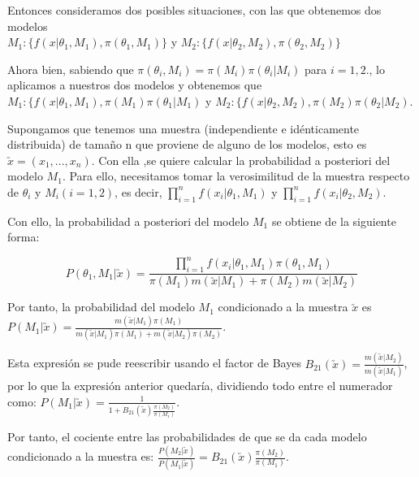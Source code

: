Entonces consideramos dos posibles situaciones, con las que obtenemos dos modelos \\$ M_1 : \{f(x | \theta_1, M_1), \pi(\theta_1, M_1) \}$ y $ M_2 : \{f(x | \theta_2, M_2), \pi(\theta_2,M _2) \}$

Ahora bien, sabiendo que $\pi(\theta_i, M_i) =  \pi(M_i) \pi(\theta_i|M_i)$  para $i = 1,2.$, lo aplicamos a nuestros dos modelos y obtenemos que $ M_1 : \{f(x | \theta_1, M_1), \pi(M_1) \pi(\theta_1|M_1)$ y $M_2 : \{f(x | \theta_2, M_2), \pi(M_2)  \pi(\theta_2|M_2)$.

Supongamos que tenemos una muestra (independiente e idénticamente distribuida) de tamaño n que proviene de alguno de los modelos, esto es $\utilde{x} = (x_1,...,x_n)$. Con ella ,se quiere calcular la probabilidad a posteriori del modelo $M_1$. Para ello, necesitamos tomar la verosimilitud de la muestra respecto de $\theta_i$ y $M_i (i = 1,2)$, es decir, $\prod_{i=1}^{n}{f(x_i|\theta_1,M_1)}$ y $\prod_{i=1}^{n}{f(x_i|\theta_2,M_2)}$.

Con ello, la probabilidad a posteriori del modelo $M_1$ se obtiene de la siguiente forma:

\[P(\theta_1,M_1| \utilde{x}) = \frac{\prod_{i=1}^{n}{f(x_i|\theta_1,M_1)}\pi(\theta_1,M_1)}{\pi(M_1)m(\utilde{x}|M_1)+\pi(M_2)m(\utilde{x}|M_2)} \]

\begin{comment}
$ P(\theta_1, M_1 | \utilde{x}) =  \[\frac{\prod_{i=1}^{n}{f(x_i|\theta_1,M_1)}}\ * \pi(\theta_1,M_1)}{m(\utilde{x} | M_1) * \pi(M_1) + m(\utilde{x} | M_2) * \pi(M_2)}\], donde $m(\utilde{x} | M_i) = \int_{\Theta_i}{f(\utilde{x} | \theta_i, M_i) * \pi(\theta_i | M_i)  d\theta_i}, para i = 1,2 $.
\end{comment}

Por tanto, la probabilidad del modelo $M_1$ condicionado a la muestra $\utilde{x}$ es\\ $P(M_1 | \utilde{x}) = \frac{m(\utilde{x}| M_1) \pi(M_1) }{m(\utilde{x}| M_1)\pi(M_1) + m(\utilde{x}| M_2)\pi(M_2) }$.

Esta expresión se pude reescribir usando el factor de Bayes $B_{21}(\utilde{x}) = \frac{m(\utilde{x}| M_2)}{m(\utilde{x}| M_1)}$, por lo que la expresión anterior quedaría, dividiendo todo entre el numerador como: $P(M_1 | \utilde{x}) = \frac{1}{1 + B_{21}(\utilde{x})  \frac{\pi(M_2)}{\pi(M_1)}}$.

Por tanto, el cociente entre las probabilidades de que se da cada modelo condicionado a la muestra es:
$  \frac{P(M_2 | \utilde{x})}{P(M_1 | \utilde{x})} = B_{21}(\utilde{x})  \frac{\pi(M_2)}{\pi(M_1)}$.

